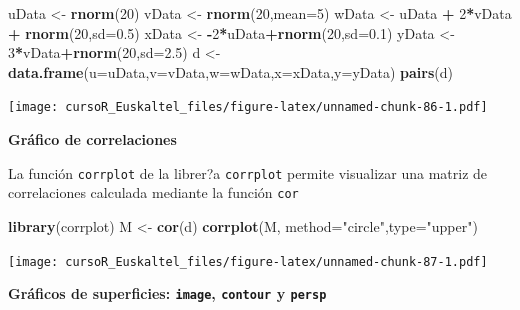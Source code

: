 \documentclass[]{book}
\newenvironment{Shaded}{\begin{snugshade}}{\end{snugshade}}
\newcommand{\KeywordTok}[1]{\textcolor[rgb]{0.13,0.29,0.53}{\textbf{#1}}}
\newcommand{\DataTypeTok}[1]{\textcolor[rgb]{0.13,0.29,0.53}{#1}}
\newcommand{\DecValTok}[1]{\textcolor[rgb]{0.00,0.00,0.81}{#1}}
\newcommand{\FloatTok}[1]{\textcolor[rgb]{0.00,0.00,0.81}{#1}}
\newcommand{\StringTok}[1]{\textcolor[rgb]{0.31,0.60,0.02}{#1}}
\newcommand{\OperatorTok}[1]{\textcolor[rgb]{0.81,0.36,0.00}{\textbf{#1}}}
\newcommand{\NormalTok}[1]{#1}
\begin{document}
\begin{Shaded}
\begin{Highlighting}[]
\NormalTok{uData <-}\StringTok{ }\KeywordTok{rnorm}\NormalTok{(}\DecValTok{20}\NormalTok{)}
\NormalTok{vData <-}\StringTok{ }\KeywordTok{rnorm}\NormalTok{(}\DecValTok{20}\NormalTok{,}\DataTypeTok{mean=}\DecValTok{5}\NormalTok{)}
\NormalTok{wData <-}\StringTok{ }\NormalTok{uData }\OperatorTok{+}\StringTok{ }\DecValTok{2}\OperatorTok{*}\NormalTok{vData }\OperatorTok{+}\StringTok{ }\KeywordTok{rnorm}\NormalTok{(}\DecValTok{20}\NormalTok{,}\DataTypeTok{sd=}\FloatTok{0.5}\NormalTok{)}
\NormalTok{xData <-}\StringTok{ }\OperatorTok{-}\DecValTok{2}\OperatorTok{*}\NormalTok{uData}\OperatorTok{+}\KeywordTok{rnorm}\NormalTok{(}\DecValTok{20}\NormalTok{,}\DataTypeTok{sd=}\FloatTok{0.1}\NormalTok{)}
\NormalTok{yData <-}\StringTok{  }\DecValTok{3}\OperatorTok{*}\NormalTok{vData}\OperatorTok{+}\KeywordTok{rnorm}\NormalTok{(}\DecValTok{20}\NormalTok{,}\DataTypeTok{sd=}\FloatTok{2.5}\NormalTok{)}
\NormalTok{d <-}\StringTok{ }\KeywordTok{data.frame}\NormalTok{(}\DataTypeTok{u=}\NormalTok{uData,}\DataTypeTok{v=}\NormalTok{vData,}\DataTypeTok{w=}\NormalTok{wData,}\DataTypeTok{x=}\NormalTok{xData,}\DataTypeTok{y=}\NormalTok{yData)}
\KeywordTok{pairs}\NormalTok{(d)}
\end{Highlighting}
\end{Shaded}

\texttt{[image: cursoR\_Euskaltel\_files/figure-latex/unnamed-chunk-86-1.pdf]}

\textbf{Gráfico de correlaciones}

La función \texttt{corrplot} de la librer?a \texttt{corrplot} permite
visualizar una matriz de correlaciones calculada mediante la función
\texttt{cor}

\begin{Shaded}
\begin{Highlighting}[]
\KeywordTok{library}\NormalTok{(corrplot)}
\NormalTok{M <-}\StringTok{ }\KeywordTok{cor}\NormalTok{(d)}
\KeywordTok{corrplot}\NormalTok{(M, }\DataTypeTok{method=}\StringTok{"circle"}\NormalTok{,}\DataTypeTok{type=}\StringTok{"upper"}\NormalTok{)}
\end{Highlighting}
\end{Shaded}

\texttt{[image: cursoR\_Euskaltel\_files/figure-latex/unnamed-chunk-87-1.pdf]}

\textbf{Gráficos de superficies: \texttt{image}, \texttt{contour} y
\texttt{persp}}
\end{document}
